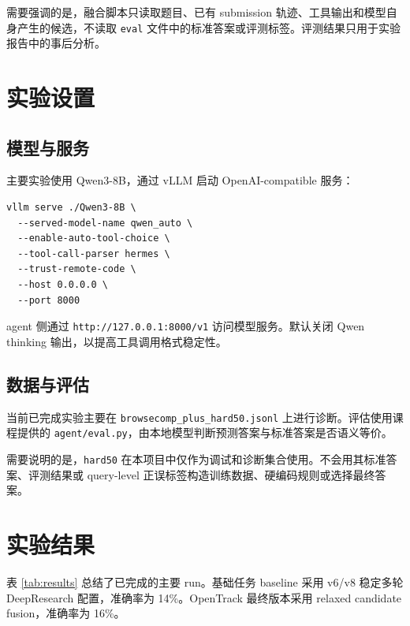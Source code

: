 \documentclass[a4paper]{article}
\begin{document}
需要强调的是，融合脚本只读取题目、已有 submission 轨迹、工具输出和模型自身产生的候选，不读取 \verb|eval| 文件中的标准答案或评测标签。评测结果只用于实验报告中的事后分析。

\section{实验设置}

\subsection{模型与服务}

主要实验使用 Qwen3-8B，通过 vLLM 启动 OpenAI-compatible 服务：

\begin{verbatim}
vllm serve ./Qwen3-8B \
  --served-model-name qwen_auto \
  --enable-auto-tool-choice \
  --tool-call-parser hermes \
  --trust-remote-code \
  --host 0.0.0.0 \
  --port 8000
\end{verbatim}

agent 侧通过 \verb|http://127.0.0.1:8000/v1| 访问模型服务。默认关闭 Qwen thinking 输出，以提高工具调用格式稳定性。

\subsection{数据与评估}

当前已完成实验主要在 \verb|browsecomp_plus_hard50.jsonl| 上进行诊断。评估使用课程提供的 \verb|agent/eval.py|，由本地模型判断预测答案与标准答案是否语义等价。

需要说明的是，\verb|hard50| 在本项目中仅作为调试和诊断集合使用。不会用其标准答案、评测结果或 query-level 正误标签构造训练数据、硬编码规则或选择最终答案。

\section{实验结果}

表 \ref{tab:results} 总结了已完成的主要 run。基础任务 baseline 采用 v6/v8 稳定多轮 DeepResearch 配置，准确率为 14\%。OpenTrack 最终版本采用 relaxed candidate fusion，准确率为 16\%。
\end{document}

